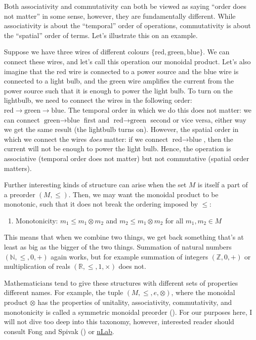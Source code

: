 \documentclass[
  openany]{book}
\providecommand{\tightlist}{%
  \setlength{\itemsep}{0pt}\setlength{\parskip}{0pt}}
\theoremstyle{definition}
\theoremstyle{definition}
\theoremstyle{definition}
\theoremstyle{definition}
\theoremstyle{remark}
\begin{document}
Both associativity and commutativity can both be viewed as saying ``order does not matter'' in some sense, however, they are fundamentally different. While associativity is about the ``temporal'' order of operations, commutativity is about the ``spatial'' order of terms. Let's illustrate this on an example.

Suppose we have three wires of different colours \(\{ \text{red}, \text{green}, \text{blue} \}\). We can connect these wires, and let's call this operation our monoidal product. Let's also imagine that the \(\text{red}\) wire is connected to a power source and the \(\text{blue}\) wire is connected to a light bulb, and the \(\text{green}\) wire amplifies the current from the power source such that it is enough to power the light bulb. To turn on the lightbulb, we need to connect the wires in the following order: \(\text{red} \to \text{green} \to \text{blue}\). The temporal order in which we do this does not matter: we can connect \(\text{green} \to \text{blue}\) first and \(\text{red} \to \text{green}\) second or vice versa, either way we get the same result (the lightbulb turns on). However, the spatial order in which we connect the wires \emph{does} matter: if we connect \(\text{red} \to \text{blue}\), then the current will not be enough to power the light bulb. Hence, the operation is associative (temporal order does not matter) but not commutative (spatial order matters).

Further interesting kinds of structure can arise when the set \(M\) is itself a part of a preorder \((M, \leq)\). Then, we may want the monoidal product to be monotonic, such that it does not break the ordering imposed by \(\leq\):

\begin{enumerate}
\def\labelenumi{\arabic{enumi}.}
\setcounter{enumi}{3}
\tightlist
\item
  Monotonicity: \(m_1 \leq m_1 \otimes m_2\) and \(m_2 \leq m_1 \otimes m_2\) for all \(m_1, m_2 \in M\)
\end{enumerate}

This means that when we combine two things, we get back something that's at least as big as the bigger of the two things. Summation of natural numbers \((\mathbb{N}, \leq, 0, +)\) again works, but for example summation of integers \((\mathbb{Z}, 0, +)\) or multiplication of reals \((\mathbb{R}, \leq, 1, \times)\) does not.

Mathematicians tend to give these structures with different sets of properties different names. For example, the tuple \((M, \leq, e, \otimes)\), where the monoidal product \(\otimes\) has the properties of unitality, associativity, commutativity, and monotonicity is called a symmetric monoidal preorder (). For our purposes here, I will not dive too deep into this taxonomy, however, interested reader should consult Fong and Spivak () or \href{https://ncatlab.org/nlab/show/HomePage}{nLab}.
\end{document}
